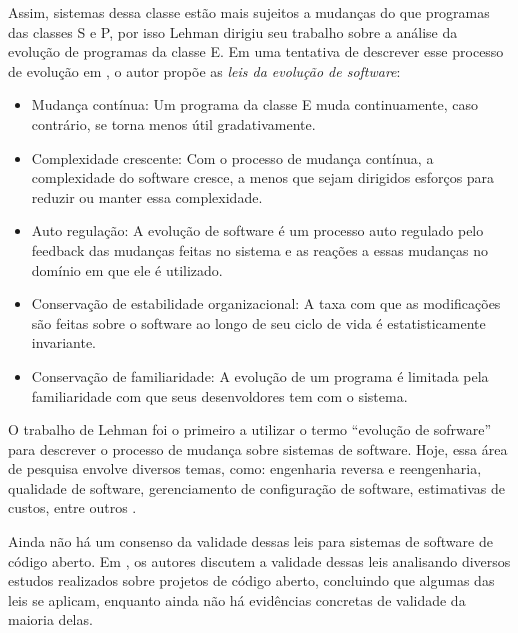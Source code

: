 \documentclass[a4paper, 12pt, twoside]{book}
\begin{document}
        Assim, sistemas dessa classe estão mais sujeitos a mudanças do que programas das classes S 
        e P, por isso Lehman dirigiu seu trabalho sobre a análise da evolução de programas da 
        classe E. Em uma tentativa de descrever esse processo de evolução em \cite{Lehman1980b}, o 
        autor propõe as \textit{leis da evolução de software}:
        \begin{itemize}
            \item Mudança contínua: Um programa da classe E muda continuamente, caso contrário, se 
                   torna menos útil gradativamente.
            \item Complexidade crescente: Com o processo de mudança contínua, a complexidade do 
                  software cresce, a menos que sejam dirigidos esforços para reduzir ou manter essa 
                  complexidade.
            \item Auto regulação: A evolução de software é um processo auto regulado pelo feedback 
                  das mudanças feitas no sistema e as reações a essas mudanças no domínio em que ele 
                  é utilizado.
            \item Conservação de estabilidade organizacional: A taxa com que as modificações são 
                  feitas sobre o software ao longo de seu ciclo de vida é estatisticamente invariante.
            \item Conservação de familiaridade: A evolução de um programa é limitada pela 
                  familiaridade com que seus desenvoldores tem com o sistema.
        \end{itemize}

        O trabalho de Lehman foi o primeiro a utilizar o termo ``evolução de sofrware'' para
        descrever o processo de mudança sobre sistemas de software. Hoje, essa área de pesquisa
        envolve diversos temas, como: engenharia reversa e reengenharia, qualidade de software,
        gerenciamento de configuração de software, estimativas de custos, entre outros 
        \cite{DBLP:series/springer/Mens08}.
        
        Ainda não há um consenso da validade dessas leis para sistemas de software de código aberto. 
        Em  \cite{DBLP:series/springer/Fernandez-RamilLWC08}, os autores discutem a validade dessas
        leis analisando diversos estudos realizados sobre projetos de código aberto, concluindo que
        algumas das leis se aplicam, enquanto ainda não há evidências concretas de validade da 
        maioria delas.
        
\end{document}
